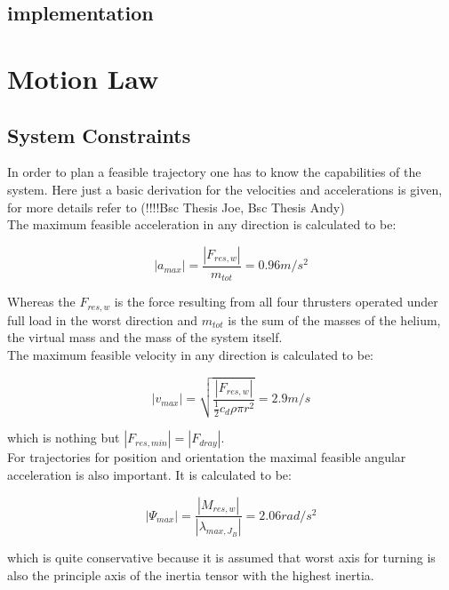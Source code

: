 \subsection{implementation}


\section{Motion Law}
\label{sec:motionLaw}
\subsection{System Constraints}
\label{subsec:systemConstraints}
In order to plan a feasible trajectory one has to know the capabilities of the system. Here just a basic derivation for the velocities and accelerations is given, for more details refer to (!!!!Bsc Thesis Joe, Bsc Thesis Andy)\\

The maximum feasible acceleration in any direction is calculated to be:

\begin{equation}
  \left|a_{max} \right| =  \frac{\left|F_{res, w}\right|}{m_{tot}} = 0.96 m/s^2
\end{equation}

Whereas the $F_{res,w}$ is the force resulting from all four thrusters operated under full load in the worst direction and $m_{tot}$ is the sum of the masses of the helium, the virtual mass and the mass of the system itself.\\


The maximum feasible velocity in any direction is calculated to be:

\begin{equation}
\left|v_{max} \right| = \sqrt{\frac{\left|F_{res,w} \right|}{\frac{1}{2}c_d \rho \pi r^2}}=2.9 m/s
\end{equation}

which is nothing but $ \left|F_{res,min} \right| = \left|F_{dray} \right| $.\\

For trajectories for position and orientation the maximal feasible angular acceleration is also important. It is calculated to be:

\begin{equation}
  \left|\Psi_{max} \right| =  \frac{\left|M_{res,w}\right|}{\left| \lambda_{max, J_{B}} \right|} = 2.06 rad/s^2 
\end{equation}

which is quite conservative because it is assumed that worst axis for turning is also the principle axis of the inertia tensor with the highest inertia.\\

